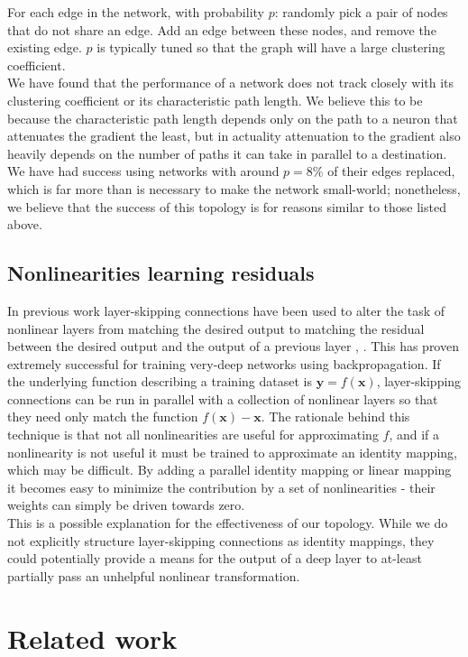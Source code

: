 \documentclass{article}
\newcommand{\mtx}[1]{\bm{#1}}
\newcommand{\npar}{\\\indent}
\begin{document}
 For each edge in the network, with probability $p$: randomly pick a pair of nodes that do not share an edge. Add an edge between these nodes, and remove the existing edge. $p$ is typically tuned so that the graph will have a large clustering coefficient.
\npar
We have found that the performance of a network does not track closely with its clustering coefficient or its characteristic path length. We believe this to be because the characteristic path length depends only on the path to a neuron that attenuates the gradient the least, but in actuality attenuation to the gradient also heavily depends on the number of paths it can take in parallel to a destination. We have had success using networks with around $p=8\%$ of their edges replaced, which is far more than is necessary to make the network small-world; nonetheless, we believe that the success of this topology is for reasons similar to those listed above.

\subsection{Nonlinearities learning residuals}

In previous work layer-skipping connections have been used to alter the task of nonlinear layers from matching the desired output to matching the residual between the desired output and the output of a previous layer \cite{he2015}, \cite{ioffe2015}. This has proven extremely successful for training very-deep networks using backpropagation. If the underlying function describing a training dataset is $\mtx{y}=f(\mtx{x})$, layer-skipping connections can be run in parallel with a collection of nonlinear layers so that they need only match the function $f(\mtx{x})-\mtx{x}$. The rationale behind this technique is that not all nonlinearities are useful for approximating $f$, and if a nonlinearity is not useful it must be trained to approximate an identity mapping, which may be difficult. By adding a parallel identity mapping or linear mapping it becomes easy to minimize the contribution by a set of nonlinearities - their weights can simply be driven towards zero.
\npar
This is a possible explanation for the effectiveness of our topology. While we do not explicitly structure layer-skipping connections as identity mappings, they could potentially provide a means for the output of a deep layer to at-least partially pass an unhelpful nonlinear transformation.


\section{Related work}
\end{document}
